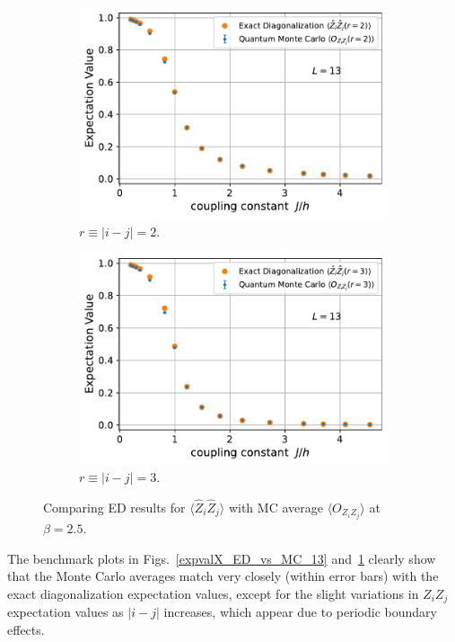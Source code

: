 \documentclass[../thesis_main.tex]{subfiles}
\begin{document}
\begin{figure}\ContinuedFloat
    \centering
    \begin{subfigure}[b]{0.5\textwidth}
        \centering
        \includegraphics[width=\textwidth]{images/13_site/L=13_ZZ(r=2).pdf}
        \caption{$r \equiv |i-j| = 2$.}
    \end{subfigure}
    \begin{subfigure}[b]{0.49\textwidth}
        \centering
        \includegraphics[width=\textwidth]{images/13_site/L=13_ZZ(r=3).pdf}
        \caption{$r \equiv |i-j| = 3$.}
    \end{subfigure}
    \caption{Comparing ED results for $\langle \hat{Z}_i \hat{Z}_j \rangle$ with MC average $\langle O_{Z_i Z_j} \rangle$ at $\beta = 2.5$.}
    \label{expvalZZ_ED_vs_MC_13}
\end{figure}
The benchmark plots in Figs.~\ref{expvalX_ED_vs_MC_13} and~\ref{expvalZZ_ED_vs_MC_13} clearly show that the Monte Carlo averages match very closely (within error bars) with the exact diagonalization expectation values, except for the slight variations in $Z_i Z_j$ expectation values as $|i-j|$ increases, which appear due to periodic boundary effects.
\end{document}
